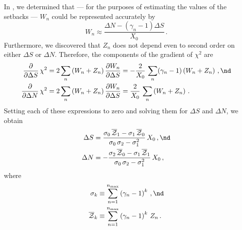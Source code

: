 In , we determined that --- for the purposes of estimating the values of the setbacks --- $W_n$ could be represented accurately by
\begin{equation}
  W_n \approx \frac{\Delta N - \left(\gamma_n - 1\right) \Delta S}{X_0}\, .
\end{equation}
Furthermore, we discovered that $Z_n$ does not depend even to second order on either $\Delta S$ or $\Delta N$. Therefore, the components of the gradient of $\chi^2$ are
\begin{subequations} \label{chi2_grad}
  \begin{align}
    \frac{\partial}{\partial \Delta S}\, \chi^2 &= 2 \sum_n \left(W_n + Z_n\right)\frac{\partial W_n}{\partial \Delta S} = -\frac{2}{X_0}\, \sum_n (\gamma_n - 1) \left(W_n + Z_n\right)\, , \nd \\
    \frac{\partial}{\partial \Delta N}\, \chi^2 &= 2 \sum_n \left(W_n + Z_n\right)\frac{\partial W_n}{\partial \Delta S} = \frac{2}{X_0}\, \sum_n \left(W_n + Z_n\right)\, .
  \end{align}
\end{subequations}
Setting each of these expressions to zero and solving them for $\Delta S$ and $\Delta N$, we obtain
\begin{subequations} \label{eqn:rms_sol}
  \begin{align}
    \label{eqn:rms_sol_ds} \Delta S &= \frac{\sigma_0\, \overline{\mathcal{Z}}_1 - \sigma_1\, \overline{\mathcal{Z}}_0}{\sigma_0\, \sigma_2 - \sigma_1^2}\, X_0\, , \nd \\
    \label{eqn:rms_sol_dn} \Delta N &= -\frac{\sigma_2\, \overline{\mathcal{Z}}_0 - \sigma_1\, \overline{\mathcal{Z}}_1}{\sigma_0\, \sigma_2 - \sigma_1^2}\, X_0\, ,
  \end{align}
\end{subequations}
where
\begin{align}
  \sigma_k &\equiv \sum_{n = 1}^{n_\text{max}} \left(\gamma_n - 1\right)^k\, , \nd \\
  \overline{\mathcal{Z}}_k &\equiv \sum_{n = 1}^{n_\text{max}} \left(\gamma_n - 1\right)^k\, Z_n\, .
\end{align}

